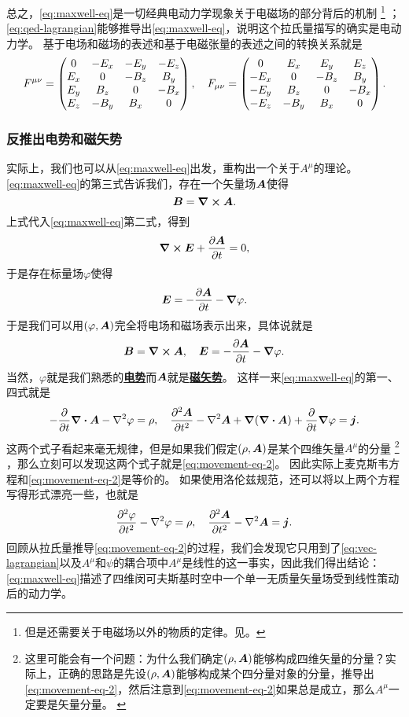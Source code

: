 \documentclass[UTF8, a4paper]{ctexart}
\newcommand*{\concept}[1]{\underline{\textbf{#1}}}
\begin{document}
总之，\eqref{eq:maxwell-eq}是一切经典电动力学现象关于电磁场的部分背后的机制%
\footnote{但是还需要关于电磁场以外的物质的定律。见。}%
；\eqref{eq:qed-lagrangian}能够推导出\eqref{eq:maxwell-eq}，说明这个拉氏量描写的确实是电动力学。
基于电场和磁场的表述和基于电磁张量的表述之间的转换关系就是
\begin{equation}
    F^{\mu \nu} = \pmqty{
        0 & -E_x & -E_y & -E_z \\
        E_x & 0 & -B_z & B_y \\
        E_y & B_z & 0 & -B_x \\
        E_z & -B_y & B_x & 0
    }, \quad F_{\mu \nu} = \pmqty{
        0 & E_x & E_y & E_z \\
        -E_x & 0 & -B_z & B_y \\
        -E_y & B_z & 0 & -B_x \\
        -E_z & -B_y & B_x & 0
    }.
\end{equation}

\subsubsection{反推出电势和磁矢势}

实际上，我们也可以从\eqref{eq:maxwell-eq}出发，重构出一个关于$A^\mu$的理论。
\eqref{eq:maxwell-eq}的第三式告诉我们，存在一个矢量场$\vb*{A}$使得
\[
    \vb*{B} = \curl{\vb*{A}}.
\]
上式代入\eqref{eq:maxwell-eq}第二式，得到
\[
    \curl{\vb*{E} + \pdv{\vb*{A}}{t}} = 0,
\]
于是存在标量场$\varphi$使得
\[
    \vb*{E} = - \pdv{\vb*{A}}{t} - \grad{\varphi}.
\]
于是我们可以用$(\varphi, \vb*{A})$完全将电场和磁场表示出来，具体说就是
\begin{equation}
    \vb*{B} = \curl{\vb*{A}}, \quad \vb*{E} = - \pdv{\vb*{A}}{t} - \grad{\varphi}.
    \label{eq:e-b-from-a-phi}
\end{equation}
当然，$\varphi$就是我们熟悉的\concept{电势}而$\vb*{A}$就是\concept{磁矢势}。
这样一来\eqref{eq:maxwell-eq}的第一、四式就是
\[
    - \pdv{t} \div{\vb*{A}} - \laplacian \varphi = \rho, \quad \pdv[2]{\vb*{A}}{t} - \laplacian \vb*{A} + \grad(\div{\vb*{A}}) + \pdv{t} \grad{\varphi} = \vb*{j}.
\]
这两个式子看起来毫无规律，但是如果我们假定$(\rho, \vb*{A})$是某个四维矢量$A^\mu$的分量%
\footnote{这里可能会有一个问题：为什么我们确定$(\rho, \vb*{A})$能够构成四维矢量的分量？实际上，正确的思路是先设$(\rho, \vb*{A})$能够构成某个四分量对象的分量，推导出\eqref{eq:movement-eq-2}，然后注意到\eqref{eq:movement-eq-2}如果总是成立，那么$A^\mu$一定要是矢量分量。
\label{note:vector-component}}%
，那么立刻可以发现这两个式子就是\eqref{eq:movement-eq-2}。
因此实际上麦克斯韦方程和\eqref{eq:movement-eq-2}是等价的。
如果使用洛伦兹规范，还可以将以上两个方程写得形式漂亮一些，也就是
\begin{equation}
    \pdv[2]{\varphi}{t} - \laplacian \varphi = \rho, \quad \pdv[2]{\vb*{A}}{t} - \laplacian \vb*{A} = \vb*{j}.
    \label{eq:wave-eq}
\end{equation}
回顾从拉氏量推导\eqref{eq:movement-eq-2}的过程，我们会发现它只用到了\eqref{eq:vec-lagrangian}以及$A^\mu$和$\psi$的耦合项中$A^\mu$是线性的这一事实，因此我们得出结论：\eqref{eq:maxwell-eq}描述了四维闵可夫斯基时空中一个单一无质量矢量场受到线性策动后的动力学。
\end{document}
